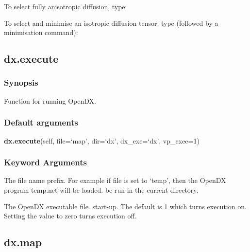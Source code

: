 



To select fully anisotropic diffusion, type:


To select and minimise an isotropic diffusion tensor, type (followed by a minimisation
command):




\newpage

\subsection{dx.execute}


\subsubsection{Synopsis}

Function for running OpenDX.

\subsubsection{Default arguments}

\textsf{\textbf{dx.execute}(self, file=`map', dir=`dx', dx\_exe=`dx', vp\_exec=1)}


\subsubsection{Keyword Arguments}

  The file name prefix.  For example if file is set to `temp', then the OpenDX program temp.net will be loaded.
be run in the current directory.

  The OpenDX executable file.
start-up.  The default is 1 which turns execution on.  Setting the value to zero turns
execution off.


\newpage

\subsection{dx.map}


